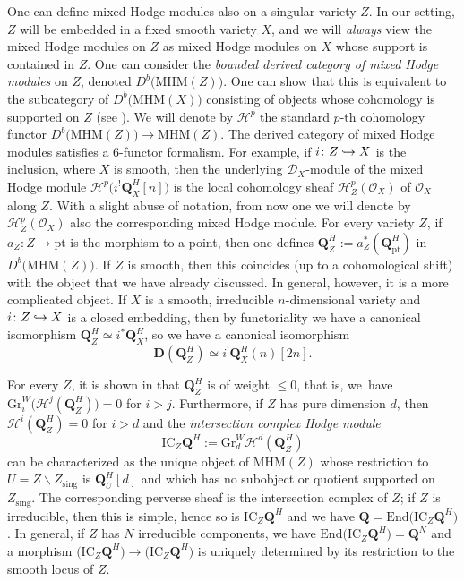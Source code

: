 \documentclass[11pt]{article}
\numberwithin{equation}{section}
\newcommand\hto{\mathrel{\lhook\joinrel\to}}
\newcommand{\DXmodule}{$\cD_X$\nobreakdash-mod\-ule\xspace}
\theoremstyle{plain}
\theoremstyle{definition}
\newcommand\Q{{\mathbf Q}}
\newcommand\cD{\mathcal{D}}
\newcommand\cH{\mathcal{H}}
\newcommand\cO{\mathcal{O}}
\newcommand\cH{\mathcal{H}}
\newcommand\cO{\mathcal{O}}
\newcommand\gr{\mathrm{Gr}}
\newcommand\sing{\mathrm{sing}}
\begin{document}
One can define mixed Hodge modules also on a singular variety $Z$. In our setting, $Z$ will be embedded in a fixed smooth variety $X$,
and we will \emph{always} view the mixed Hodge modules on $Z$ as mixed Hodge modules on $X$
whose support is contained in $Z$. One can consider the \emph{bounded derived category of mixed Hodge modules} on $Z$, denoted $D^b\big(\mathrm{MHM}(Z)\big)$.
One can show that this is equivalent to the subcategory of $D^b\big(\mathrm{MHM}(X)\big)$ consisting of objects whose cohomology is supported on $Z$ (see \cite[Cor.\,2.23]{Saito_MHM}).
We will denote by $\cH^p$ the standard $p$-th cohomology functor $D^b\big(\mathrm{MHM}(Z)\big)\to \mathrm{MHM}(Z)$.
The derived category of mixed Hodge modules satisfies a 6-functor formalism. For example, if $i\colon Z\hto X$ is the inclusion, where $X$ is smooth, then the underlying \DXmodule of the mixed Hodge module $\cH^p\big(i^!\Q_X^H[n]\big)$
is the \hbox{local} cohomology sheaf $\cH^p_Z(\cO_X)$ of $\cO_X$ along $Z$. With a slight abuse of notation, from now one we will denote by $\cH^p_Z(\cO_X)$
also the corresponding mixed Hodge module.
For every variety $Z$, if $a_Z\colon Z\to \mathrm{pt}$ is the morphism to a point, then one defines $\Q_Z^H:=a_Z^*(\Q_\mathrm{pt}^H)$ in $D^b\big(\mathrm{MHM}(Z)\big)$. If $Z$ is smooth, then this coincides
(up to a cohomological shift) with the object that we have already discussed. In general, however, it is a more complicated object.
If $X$ is a smooth, irreducible $n$-dimensional variety and $i\colon Z\hto X$ is a closed embedding, then
by functoriality we have
a canonical isomorphism $\Q_Z^H\simeq i^*\Q_X^H$, so we have a canonical isomorphism
\begin{equation}\label{eq1_dual_Q}
{\mathbf D}(\Q_Z^H)\simeq i^!\Q_X^H(n)[2n].
\end{equation}

For every $Z$, it is shown in
\cite[\S 4.5]{Saito_MHM} that $\Q_Z^H$ is of weight $\leq 0$, that is, we~have $\gr^W_i\big(\cH^j(\Q_Z^H)\big)\!=\!0$ for $i\!>\!j$. Furthermore, if $Z$ has pure dimension $d$,
then $\cH^i(\Q_Z^H)\!=\!0$ for $i>d$ and the \emph{intersection complex Hodge module}
\begin{equation}\label{definition_IC}
\mathrm{IC}_Z\Q^H:=\gr^W_d\cH^d(\Q_Z^H)
\end{equation}
can be characterized as the unique object of $\mathrm{MHM}(Z)$ whose restriction to $U=Z\smallsetminus Z_\sing$ is $\Q_U^H[d]$ and which has no subobject or quotient supported on
$Z_\sing$. The corresponding perverse sheaf is the intersection complex of $Z$; if $Z$ is irreducible, then
this is simple, hence so is $\mathrm{IC}_Z\Q^H$ and we have $\Q=\mathrm{End}\big(\mathrm{IC}_Z\Q^H\big)$. In general, if $Z$ has $N$ irreducible
components, we have $\mathrm{End}\big(\mathrm{IC}_Z\Q^H\big)=\Q^N$ and a morphism $\big(\mathrm{IC}_Z\Q^H\big)\to \big(\mathrm{IC}_Z\Q^H\big)$
is uniquely determined by its restriction to the smooth locus of $Z$.
\end{document}
